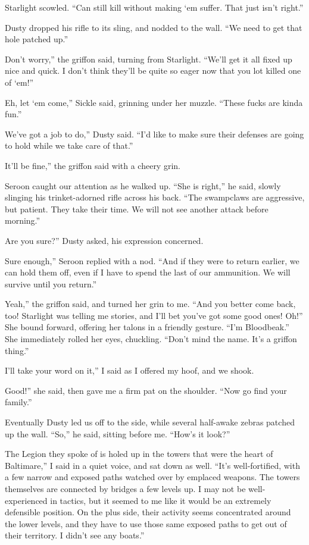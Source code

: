 Starlight scowled. “Can still kill without making ‘em suffer. That just isn’t right.”

Dusty dropped his rifle to its sling, and nodded to the wall. “We need to get that hole patched up.”

\leavevmode{}Don’t worry,” the griffon said, turning from Starlight. “We’ll get it all fixed up nice and quick. I don’t think they’ll be quite so eager now that you lot killed one of ‘em!”

\leavevmode{}Eh, let ‘em come,” Sickle said, grinning under her muzzle. “These fucks are kinda fun.”

\leavevmode{}We’ve got a job to do,” Dusty said. “I’d like to make sure their defenses are going to hold while we take care of that.”

\leavevmode{}It’ll be fine,” the griffon said with a cheery grin.

Seroon caught our attention as he walked up. “She is right,” he said, slowly slinging his trinket-adorned rifle across his back. “The swampclaws are aggressive, but patient. They take their time. We will not see another attack before morning.”

\leavevmode{}Are you sure?” Dusty asked, his expression concerned.

\leavevmode{}Sure enough,” Seroon replied with a nod. “And if they were to return earlier, we can hold them off, even if I have to spend the last of our ammunition. We will survive until you return.”

\leavevmode{}Yeah,” the griffon said, and turned her grin to me. “And you better come back, too! Starlight was telling me stories, and I’ll bet you’ve got some good ones! Oh!” She bound forward, offering her talons in a friendly gesture. “I’m Bloodbeak.” She immediately rolled her eyes, chuckling. “Don’t mind the name. It’s a griffon thing.”

\leavevmode{}I’ll take your word on it,” I said as I offered my hoof, and we shook.

\leavevmode{}Good!” she said, then gave me a firm pat on the shoulder. “Now go find your family.”

Eventually Dusty led us off to the side, while several half-awake zebras patched up the wall. “So,” he said, sitting before me. “How’s it look?”

\leavevmode{}The Legion they spoke of is holed up in the towers that were the heart of Baltimare,” I said in a quiet voice, and sat down as well. “It’s well-fortified, with a few narrow and exposed paths watched over by emplaced weapons. The towers themselves are connected by bridges a few levels up. I may not be well-experienced in tactics, but it seemed to me like it would be an extremely defensible position. On the plus side, their activity seems concentrated around the lower levels, and they have to use those same exposed paths to get out of their territory. I didn’t see any boats.”

